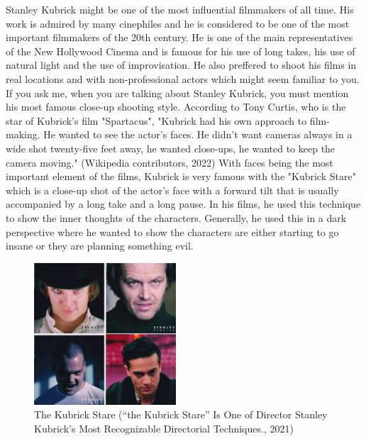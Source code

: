\documentclass[12pt]{article}
\begin{document}
\FloatBarrier

\par
Stanley Kubrick might be one of the most influential filmmakers of all time. His work is admired by many cinephiles and
he is considered to be one of the most important filmmakers of the 20th century.
He is one of the main representatives of the New Hollywood Cinema and is famous for his use of long takes,
his use of natural light and the use of improvisation. He also preffered to shoot his films in real locations
and with non-professional actors which might seem familiar to you.
\\
If you ask me, when you are talking about Stanley Kubrick, you must mention his most famous close-up shooting style. According to Tony Curtis,
who is the star of Kubrick's film "Spartacus", "Kubrick had his own approach to film-making. He wanted to see the actor's faces.
He didn't want cameras always in a wide shot twenty-five feet away, he wanted close-ups, he wanted to keep the camera moving." (Wikipedia contributors, 2022)
With faces being the most important element of the films, Kubrick is very famous with the "Kubrick Stare" which is a close-up shot of the actor's
face with a forward tilt that is usually accompanied by a long take and a long pause. In his films,
he used this technique to show the inner thoughts of the characters. Generally, he used this in a dark perspective where he wanted to show
the characters are either starting to go insane or they are planning something evil.
\\

\begin{figure}[h]
        \begin{center}
                \includegraphics[width=200px]{k_stare}
                \caption{The Kubrick Stare (“the Kubrick Stare” Is One of Director Stanley Kubrick’s Most Recognizable Directorial Techniques., 2021)}
        \end{center}
\end{figure}
\end{document}
